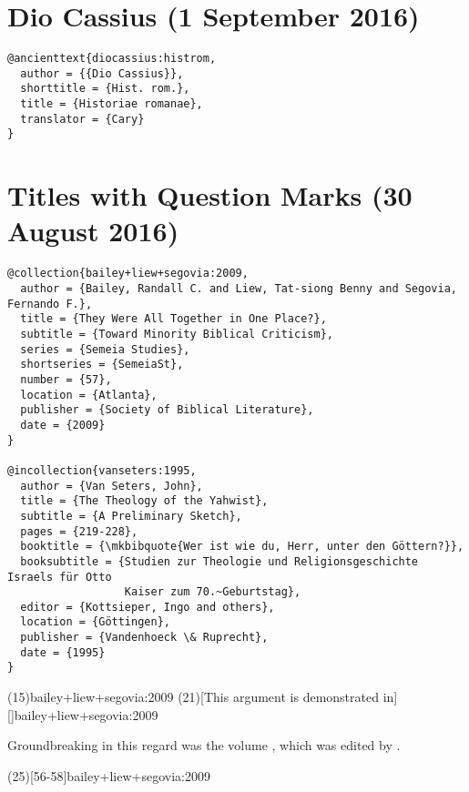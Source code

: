 \documentclass[a4paper]{article}
\begin{document}
\begin{verbcite}
  \nocite{johnsonhodge:2013}
\end{verbcite}
\exampleabbreviations
\examplebibliography
{}

\section{Dio Cassius (1 September 2016)}

\begin{verbatim}
@ancienttext{diocassius:histrom,
  author = {{Dio Cassius}},
  shorttitle = {Hist. rom.},
  title = {Historiae romanae},
  translator = {Cary}
}
\end{verbatim}

\exampleabbreviations
{}

\section{Titles with Question Marks (30 August 2016)}

\begin{verbatim}
@collection{bailey+liew+segovia:2009,
  author = {Bailey, Randall C. and Liew, Tat-siong Benny and Segovia, Fernando F.},
  title = {They Were All Together in One Place?},
  subtitle = {Toward Minority Biblical Criticism},
  series = {Semeia Studies},
  shortseries = {SemeiaSt},
  number = {57},
  location = {Atlanta},
  publisher = {Society of Biblical Literature},
  date = {2009}
}

@incollection{vanseters:1995,
  author = {Van Seters, John},
  title = {The Theology of the Yahwist},
  subtitle = {A Preliminary Sketch},
  pages = {219-228},
  booktitle = {\mkbibquote{Wer ist wie du, Herr, unter den Göttern?}},
  booksubtitle = {Studien zur Theologie und Religionsgeschichte Israels für Otto
                  Kaiser zum 70.~Geburtstag},
  editor = {Kottsieper, Ingo and others},
  location = {Göttingen},
  publisher = {Vandenhoeck \& Ruprecht},
  date = {1995}
}
\end{verbatim}

\examplecite(15){bailey+liew+segovia:2009}
\examplecite(21)[This argument is demonstrated in][]{bailey+liew+segovia:2009}
\begin{verbcite}
  Groundbreaking in this regard was the volume
  , which was edited by
  \citeauthor{bailey+liew+segovia:2009}.
\end{verbcite}
\examplecite(25)[56-58]{bailey+liew+segovia:2009}
\begin{verbcite}
  \nocite{vanseters:1995}
\end{verbcite}
\exampleabbreviations
\examplebibliography
{}
\end{document}
